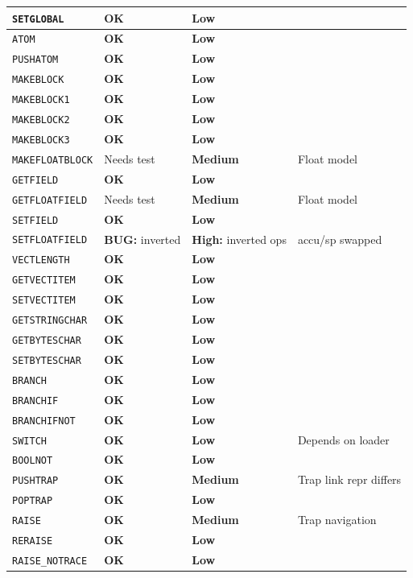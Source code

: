 \documentclass[11pt,a4paper]{article}
\newcommand{\statusok}{\textbf{\textcolor{green!50!black}{OK}}\xspace}
\newcommand{\statusbug}[1]{\textbf{\textcolor{red!70!black}{BUG:}} #1\xspace}
\newcommand{\risklow}{\textcolor{green!50!black}{\textbf{Low}}\xspace}
\newcommand{\riskmed}{\textcolor{orange!80!black}{\textbf{Medium}}\xspace}
\newcommand{\riskhigh}[1]{\textcolor{red!70!black}{\textbf{High:}} #1\xspace}
\begin{document}
\begin{longtable}{llll}
\texttt{SETGLOBAL} & \statusok & \risklow & \\
\midrule
\texttt{ATOM} & \statusok & \risklow & \\
\texttt{PUSHATOM} & \statusok & \risklow & \\
\texttt{MAKEBLOCK} & \statusok & \risklow & \\
\texttt{MAKEBLOCK1} & \statusok & \risklow & \\
\texttt{MAKEBLOCK2} & \statusok & \risklow & \\
\texttt{MAKEBLOCK3} & \statusok & \risklow & \\
\texttt{MAKEFLOATBLOCK} & Needs test & \riskmed & Float model \\
\midrule
\texttt{GETFIELD} & \statusok & \risklow & \\
\texttt{GETFLOATFIELD} & Needs test & \riskmed & Float model \\
\texttt{SETFIELD} & \statusok & \risklow & \\
\texttt{SETFLOATFIELD} & \statusbug{inverted} & \riskhigh{inverted ops} & accu/sp swapped \\
\midrule
\texttt{VECTLENGTH} & \statusok & \risklow & \\
\texttt{GETVECTITEM} & \statusok & \risklow & \\
\texttt{SETVECTITEM} & \statusok & \risklow & \\
\texttt{GETSTRINGCHAR} & \statusok & \risklow & \\
\texttt{GETBYTESCHAR} & \statusok & \risklow & \\
\texttt{SETBYTESCHAR} & \statusok & \risklow & \\
\midrule
\texttt{BRANCH} & \statusok & \risklow & \\
\texttt{BRANCHIF} & \statusok & \risklow & \\
\texttt{BRANCHIFNOT} & \statusok & \risklow & \\
\texttt{SWITCH} & \statusok & \risklow & Depends on loader \\
\texttt{BOOLNOT} & \statusok & \risklow & \\
\midrule
\texttt{PUSHTRAP} & \statusok & \riskmed & Trap link repr differs \\
\texttt{POPTRAP} & \statusok & \risklow & \\
\texttt{RAISE} & \statusok & \riskmed & Trap navigation \\
\texttt{RERAISE} & \statusok & \risklow & \\
\texttt{RAISE\_NOTRACE} & \statusok & \risklow & \\

\end{longtable}
\end{document}
